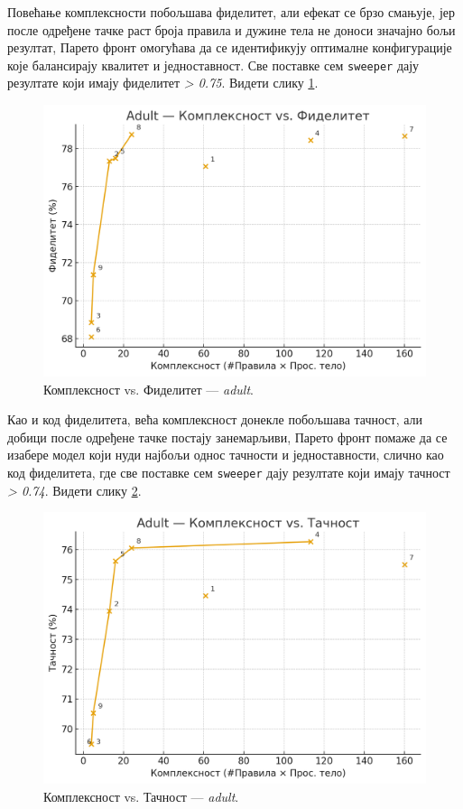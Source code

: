Повећање комплексности побољшава фиделитет, али ефекат се брзо смањује, јер после одређене тачке раст броја правила и дужине тела не доноси значајно бољи резултат, Парето фронт омогућава да се идентификују оптималне конфигурације које балансирају квалитет и једноставност. Све поставке сем \texttt{sweeper} дају резултате који имају фиделитет \textit{> 0.75}. Видети слику \ref{fig:adult-complexity-fidelity}.
\begin{figure}[H]
  \centering
  \includegraphics[width=.85\linewidth]{images/charts/adult-kompleksnost-fidelitet.png}
  \caption{Комплексност vs. Фиделитет — \textit{adult}.}
  \label{fig:adult-complexity-fidelity}
\end{figure}

Као и код фиделитета, већа комплексност донекле побољшава тачност, али добици после одређене тачке постају занемарљиви, Парето фронт помаже да се изабере модел који нуди најбољи однос тачности и једноставности, слично као код фиделитета, где све поставке сем \texttt{sweeper} дају резултате који имају тачност \textit{> 0.74}. Видети слику \ref{fig:adult-complexity-accuracy}.
\begin{figure}[H]
  \centering
  \includegraphics[width=.85\linewidth]{images/charts/adult-kompleksnost-tacnost.png}
  \caption{Комплексност vs. Тачност — \textit{adult}.}
  \label{fig:adult-complexity-accuracy}
\end{figure}

